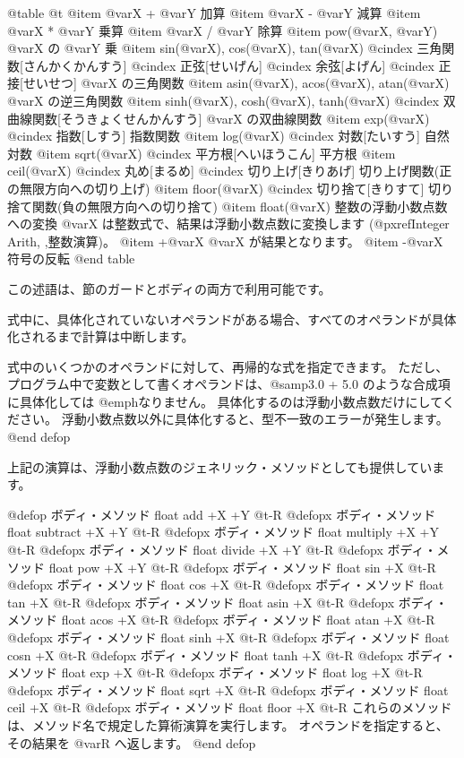 {{@table @t
@item @var{X} + @var{Y}
加算
@item @var{X} - @var{Y}
減算
@item @var{X} * @var{Y}
乗算
@item @var{X} / @var{Y}
除算
@item pow(@var{X}, @var{Y})
@var{X} の @var{Y} 乗
@item sin(@var{X}), cos(@var{X}), tan(@var{X})
@cindex 三角関数[さんかくかんすう]
@cindex 正弦[せいげん]
@cindex 余弦[よげん]
@cindex 正接[せいせつ]
@var{X} の三角関数
@item asin(@var{X}), acos(@var{X}), atan(@var{X})
@var{X} の逆三角関数
@item sinh(@var{X}), cosh(@var{X}), tanh(@var{X})
@cindex 双曲線関数[そうきょくせんかんすう]
@var{X} の双曲線関数
@item exp(@var{X})
@cindex 指数[しすう]
指数関数
@item log(@var{X})
@cindex 対数[たいすう]
自然対数
@item sqrt(@var{X})
@cindex 平方根[へいほうこん]
平方根
@item ceil(@var{X})
@cindex 丸め[まるめ]
@cindex 切り上げ[きりあげ]
切り上げ関数(正の無限方向への切り上げ)
@item floor(@var{X})
@cindex 切り捨て[きりすて]
切り捨て関数(負の無限方向への切り捨て)
@item float(@var{X})
整数の浮動小数点数への変換
@var{X} は整数式で、結果は浮動小数点数に変換します
(@pxref{Integer Arith, ,整数演算})。
@item +@var{X}
@var{X} が結果となります。
@item -@var{X}
符号の反転
@end table

この述語は、節のガードとボディの両方で利用可能です。

式中に、具体化されていないオペランドがある場合、すべてのオペランドが具体化されるまで計算は中断します。

式中のいくつかのオペランドに対して、再帰的な式を指定できます。
ただし、プログラム中で変数として書くオペランドは、@samp{3.0 + 5.0} のような合成項に具体化しては @emph{なりません}。
具体化するのは浮動小数点数だけにしてください。
浮動小数点数以外に具体化すると、型不一致のエラーが発生します。
@end defop

上記の演算は、浮動小数点数のジェネリック・メソッドとしても提供しています。

@defop {ボディ・メソッド} {float} add +X +Y @t{-}R
@defopx {ボディ・メソッド} {float} subtract +X +Y @t{-}R
@defopx {ボディ・メソッド} {float} multiply +X +Y @t{-}R
@defopx {ボディ・メソッド} {float} divide +X +Y @t{-}R
@defopx {ボディ・メソッド} {float} pow +X +Y @t{-}R
@defopx {ボディ・メソッド} {float} sin +X @t{-}R
@defopx {ボディ・メソッド} {float} cos +X @t{-}R
@defopx {ボディ・メソッド} {float} tan +X @t{-}R
@defopx {ボディ・メソッド} {float} asin +X @t{-}R
@defopx {ボディ・メソッド} {float} acos +X @t{-}R
@defopx {ボディ・メソッド} {float} atan +X @t{-}R
@defopx {ボディ・メソッド} {float} sinh +X @t{-}R
@defopx {ボディ・メソッド} {float} cosn +X @t{-}R
@defopx {ボディ・メソッド} {float} tanh +X @t{-}R
@defopx {ボディ・メソッド} {float} exp +X @t{-}R
@defopx {ボディ・メソッド} {float} log +X @t{-}R
@defopx {ボディ・メソッド} {float} sqrt +X @t{-}R
@defopx {ボディ・メソッド} {float} ceil +X @t{-}R
@defopx {ボディ・メソッド} {float} floor +X @t{-}R
これらのメソッドは、メソッド名で規定した算術演算を実行します。
オペランドを指定すると、その結果を @var{R} へ返します。
@end defop

}}
